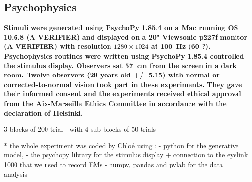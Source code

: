 \documentclass[profile,final,english, draft]{article}%
\newcommand{\citep}[1]{(\cite{#1})}
\begin{document}
%

\subsection{Psychophysics}


\textbf{Stimuli were generated using PsychoPy 1.85.4 on a Mac running OS 10.6.8 (A VERIFIER) and displayed on a 20" Viewsonic p227f monitor (A VERIFIER) with resolution $1280\times 1024$ at 100~\si{\Hz} (60 ?). Psychophysics routines were written using PsychoPy 1.85.4 controlled the stimulus display. Observers sat 57~\si{\cm} from the screen in a dark room. Twelve observers (29 years old +/- 5.15) with normal or corrected-to-normal vision took part in these experiments. They gave their informed consent and the experiments received ethical approval from the Aix-Marseille Ethics Committee in accordance with the declaration of Helsinki.}


3 blocks of 200 trial - with 4 sub-blocks of 50 trials


 * the whole experiment was coded by Chloé using :
 - python for the generative model,
 - the psychopy library for the stimulus display + connection to the eyelink 1000 that we used to record EMs
 - numpy, pandas and pylab for the data analysis
\end{document}
